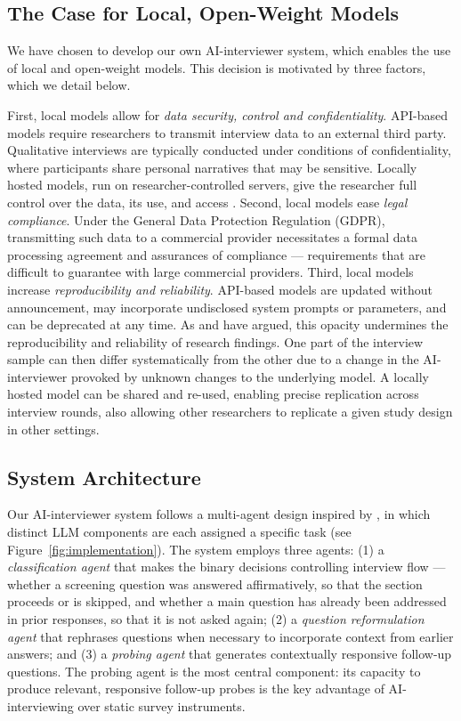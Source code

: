 \documentclass[12pt]{article}
\newcommand{\AII}{AI-interviewer}
\begin{document}
\subsection*{The Case for Local, Open-Weight Models}

We have chosen to develop our own AI-interviewer system, which enables the use of local and open-weight models. This decision is motivated by three factors, which we detail below.

First, local models allow for \textit{data security, control and confidentiality}. API-based models require researchers to transmit interview data to an external third party. Qualitative interviews are typically conducted under conditions of confidentiality, where participants share personal narratives that may be sensitive. Locally hosted models, run on researcher-controlled servers, give the researcher full control over the data, its use, and access \citep{kaiser_protecting_2009}. Second, local models ease \textit{legal compliance}. Under the General Data Protection Regulation (GDPR), transmitting such data to a commercial provider necessitates a formal data processing agreement and assurances of compliance --- requirements that are difficult to guarantee with large commercial providers. Third, local models increase \textit{reproducibility and reliability}. API-based models are updated without announcement, may incorporate undisclosed system prompts or parameters, and can be deprecated at any time. As \citet{palmer_using_2024} and \citet{Spirling2023} have argued, this opacity undermines the reproducibility and reliability of research findings. One part of the interview sample can then differ systematically from the other due to a change in the AI-interviewer provoked by unknown changes to the underlying model. A locally hosted model can be shared and re-used, enabling precise replication across interview rounds, also allowing other researchers to replicate a given study design in other settings.

\subsection*{System Architecture}

Our \AII{} system follows a multi-agent design inspired by \citet{Chopra2023}, in which distinct LLM components are each assigned a specific task (see Figure~\ref{fig:implementation}). The system employs three agents: (1) a \textit{classification agent} that makes the binary decisions controlling interview flow --- whether a screening question was answered affirmatively, so that the section proceeds or is skipped, and whether a main question has already been addressed in prior responses, so that it is not asked again; (2) a \textit{question reformulation agent} that rephrases questions when necessary to incorporate context from earlier answers; and (3) a \textit{probing agent} that generates contextually responsive follow-up questions. The probing agent is the most central component: its capacity to produce relevant, responsive follow-up probes is the key advantage of AI-interviewing over static survey instruments.
\end{document}
